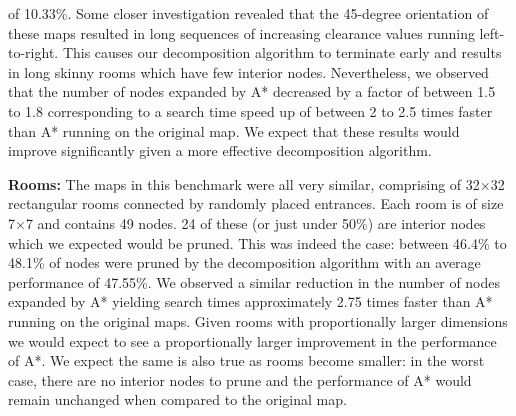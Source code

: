 of 10.33\%.
Some closer investigation revealed that the 45-degree orientation of these maps
resulted in long sequences of increasing clearance values running left-to-right.
This causes our decomposition algorithm to terminate early and results in long
skinny rooms which have few interior nodes.
Nevertheless, we observed that the number of nodes expanded by A* decreased by a
factor of between 1.5 to 1.8 corresponding to a search time speed up of between
2 to 2.5 times faster than A* running on the original map.
We expect that these results would improve significantly given a more effective
decomposition algorithm.
\par
\textbf{Rooms:}
The maps in this benchmark were all very similar, comprising of 32$\times$32
rectangular rooms connected by randomly placed entrances.
Each room is of size 7$\times$7 and contains 49 nodes. 
24 of these (or just under 50\%) are interior nodes which we expected would be
pruned.
This was indeed the case: between 46.4\% to 48.1\% of nodes were pruned by 
the decomposition algorithm with an average performance of 47.55\%.
We observed a similar reduction in the number of nodes expanded by A* yielding
search times approximately 2.75 times faster than A* running on the original
maps.
Given rooms with proportionally larger dimensions we would expect to see a
proportionally larger improvement in the performance of A*.
We expect the same is also true as rooms become smaller: in the worst case,
there are no interior nodes to prune and the performance of A* would remain
unchanged when compared to the original map.
